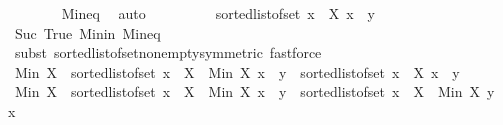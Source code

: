 \begin{isabellebody}
\ \ \ \ \ \ \isamarkupfalse%
\ Min{\isacharunderscore}{\kern0pt}eq\ \isamarkupfalse%
\ auto\isanewline
\ \ \ \ \isamarkupfalse%
\ \isamarkupfalse%
\ {\isachardoublequoteopen}{\isasymdots}\ {\isacharequal}{\kern0pt}\ sorted{\isacharunderscore}{\kern0pt}list{\isacharunderscore}{\kern0pt}of{\isacharunderscore}{\kern0pt}set\ {\isacharparenleft}{\kern0pt}{\isacharbraceleft}{\kern0pt}x\ {\isasymin}\ X{\isachardot}{\kern0pt}\ x\ {\isacharless}{\kern0pt}\ y{\isacharbraceright}{\kern0pt}{\isacharparenright}{\kern0pt}{\isachardoublequoteclose}\isanewline
\ \ \ \ \ \ \isamarkupfalse%
\ Suc\ True\ Min{\isacharunderscore}{\kern0pt}in\ Min{\isacharunderscore}{\kern0pt}eq\isanewline
\ \ \ \ \ \ \isamarkupfalse%
\ {\isacharparenleft}{\kern0pt}subst\ sorted{\isacharunderscore}{\kern0pt}list{\isacharunderscore}{\kern0pt}of{\isacharunderscore}{\kern0pt}set{\isacharunderscore}{\kern0pt}nonempty{\isacharbrackleft}{\kern0pt}symmetric{\isacharbrackright}{\kern0pt}{\isacharparenright}{\kern0pt}\ fastforce{\isacharplus}{\kern0pt}\isanewline
\ \ \ \ \isamarkupfalse%
\ \isamarkupfalse%
\ {\isachardoublequoteopen}Min\ X\ {\isacharhash}{\kern0pt}\ sorted{\isacharunderscore}{\kern0pt}list{\isacharunderscore}{\kern0pt}of{\isacharunderscore}{\kern0pt}set\ {\isacharbraceleft}{\kern0pt}x\ {\isasymin}\ {\isacharparenleft}{\kern0pt}X\ {\isacharminus}{\kern0pt}\ {\isacharbraceleft}{\kern0pt}Min\ X{\isacharbraceright}{\kern0pt}{\isacharparenright}{\kern0pt}{\isachardot}{\kern0pt}\ x\ {\isacharless}{\kern0pt}\ y{\isacharbraceright}{\kern0pt}\ {\isacharequal}{\kern0pt}\ sorted{\isacharunderscore}{\kern0pt}list{\isacharunderscore}{\kern0pt}of{\isacharunderscore}{\kern0pt}set\ {\isacharparenleft}{\kern0pt}{\isacharbraceleft}{\kern0pt}x\ {\isasymin}\ X{\isachardot}{\kern0pt}\ x\ {\isacharless}{\kern0pt}\ y{\isacharbraceright}{\kern0pt}{\isacharparenright}{\kern0pt}{\isachardoublequoteclose}\isacommand{{\isachardot}{\kern0pt}}\isamarkupfalse%
\isanewline
\ \ \ \ \isamarkupfalse%
\ {\isachardoublequoteopen}Min\ X\ {\isacharhash}{\kern0pt}\ sorted{\isacharunderscore}{\kern0pt}list{\isacharunderscore}{\kern0pt}of{\isacharunderscore}{\kern0pt}set\ {\isacharbraceleft}{\kern0pt}x\ {\isasymin}\ {\isacharparenleft}{\kern0pt}X\ {\isacharminus}{\kern0pt}\ {\isacharbraceleft}{\kern0pt}Min\ X{\isacharbraceright}{\kern0pt}{\isacharparenright}{\kern0pt}{\isachardot}{\kern0pt}\ x\ {\isacharless}{\kern0pt}\ y{\isacharbraceright}{\kern0pt}\ {\isacharat}{\kern0pt}\ sorted{\isacharunderscore}{\kern0pt}list{\isacharunderscore}{\kern0pt}of{\isacharunderscore}{\kern0pt}set\ {\isacharbraceleft}{\kern0pt}x\ {\isasymin}\ {\isacharparenleft}{\kern0pt}X\ {\isacharminus}{\kern0pt}\ {\isacharbraceleft}{\kern0pt}Min\ X{\isacharbraceright}{\kern0pt}{\isacharparenright}{\kern0pt}{\isachardot}{\kern0pt}\ y\ {\isasymle}\ x{\isacharbraceright}{\kern0pt}\ {\isacharequal}{\kern0pt}\ \isanewline

\end{isabellebody}

